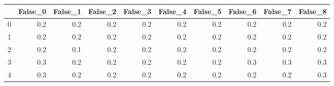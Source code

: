 \begin{tabular}{lrrrrrrrrr}
\toprule
{} &  False\_0 &  False\_1 &  False\_2 &  False\_3 &  False\_4 &  False\_5 &  False\_6 &  False\_7 &  False\_8 \\ \hline
\midrule
0 &      0.2 &      0.2 &      0.2 &      0.2 &      0.2 &      0.2 &      0.2 &      0.2 &      0.2 \\ \hline
1 &      0.2 &      0.2 &      0.2 &      0.2 &      0.2 &      0.2 &      0.2 &      0.2 &      0.2 \\ \hline
2 &      0.2 &      0.1 &      0.2 &      0.2 &      0.2 &      0.2 &      0.2 &      0.2 &      0.2 \\ \hline
3 &      0.3 &      0.2 &      0.2 &      0.2 &      0.2 &      0.2 &      0.3 &      0.3 &      0.3 \\ \hline
4 &      0.3 &      0.2 &      0.2 &      0.2 &      0.2 &      0.2 &      0.2 &      0.2 &      0.3 \\ \hline
\bottomrule
\end{tabular}
